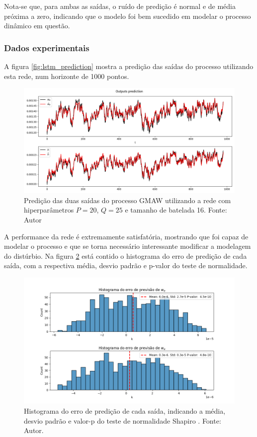 Nota-se que, para ambas as saídas, o ruído de predição é normal e de média próxima a zero, indicando que o modelo foi bem sucedido em modelar o processo dinâmico em questão.

\subsubsection{Dados experimentais}
A figura \ref{fig:lstm_prediction} mostra a predição das saídas do processo utilizando esta rede, num horizonte de 1000 pontos.
\begin{figure}[hbt!]
    \centering
    \includegraphics[width=0.7\linewidth]{Imagens/chap04/simulation_lstm_prediction.png}
    \caption{Predição das duas saídas do processo GMAW utilizando a rede com hiperparâmetros $P=20$, $Q=25$ e tamanho de batelada 16. Fonte: Autor}
    \label{fig:sim_lstm_prediction}
\end{figure}

A performance da rede é extremamente satisfatória, mostrando que foi capaz de modelar o processo e que se torna necessário interessante modificar a modelagem do distúrbio. Na figura \ref{fig:sim_error_histogram} está contido o histograma do erro de predição de cada saída, com a respectiva média, desvio padrão e p-valor do teste de normalidade. 

\begin{figure}[hbt!]
    \centering
    \includegraphics[width=0.7\linewidth]{Imagens/chap04/simulation_error_histogram.png}
    \caption{Histograma do erro de predição de cada saída, indicando a média, desvio padrão e valor-p do teste de normalidade Shapiro \cite{shapiro1965analysis}. Fonte: Autor.}
    \label{fig:sim_error_histogram}
\end{figure}

